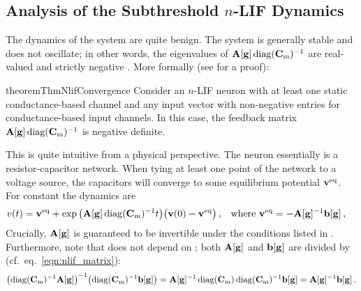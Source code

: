 \pagebreak

\subsection{Analysis of the Subthreshold $n$-LIF Dynamics}
\label{sec:nlif_subth_properties}

The dynamics of the \nlif system are quite benign.
The system is generally stable and does not oscillate; in other words, the eigenvalues of $\mathbf{A}[\mathbf{g}] \operatorname{\mathrm{diag}}({{\mathbf{C}}_\mathrm{m}})^{-1}$ are real-valued and strictly negative \citep[e.g.,][Chapter~5]{strogatz1994nonlinear}.
More formally (see  for a proof):
\begin{restatable}{theorem}{ThmNlifConvergence}
\label{thm:nlif_convergence}
Consider an $n$-LIF neuron with at least one static conductance-based channel and any input vector \vng with non-negative entries for conductance-based input channels.
In this case, the feedback matrix $\mathbf{A}[\mathbf{g}] \operatorname{\mathrm{diag}}({{\mathbf{C}}_\mathrm{m}})^{-1}$ is negative definite.
\end{restatable}
This is quite intuitive from a physical perspective.
The \nlif neuron essentially is a resistor-capacitor network.
When tying at least one point of the network to a voltage source, the capacitors will converge to some equilibrium potential $\mathbf{v}^\mathrm{eq}$.
For constant \vng the dynamics are
\begin{align}
	{{\ensuremath{v}}}(t)
		&= \mathbf{v}^\mathrm{eq} + \exp\big(\mathbf{A}[\mathbf{g}] \operatorname{\mathrm{diag}}({{\mathbf{C}}_\mathrm{m}})^{-1} t\big) \big({\mathbf{v}}(0) - \mathbf{v}^\mathrm{eq}\big) \,,
		& \text{where }  \mathbf{v}^\mathrm{eq} &= -\mathbf{A}[\mathbf{g}]^{-1} \mathbf{b}[\mathbf{g}] \,,
	\label{eqn:nlif_dynamics}
\end{align}
Crucially, $\mathbf{A}[\mathbf{g}]$ is guaranteed to be invertible under the conditions listed in .
Furthermore, note that \vneq does not depend on \vCm; both $\mathbf{A}[\mathbf{g}]$ and $\mathbf{b}[\mathbf{g}]$ are divided by \vCm (cf.~eq.~\ref{eqn:nlif_matrix}):
\begin{align*}
	  \bigl(\operatorname{\mathrm{diag}}({{\mathbf{C}}_\mathrm{m}})^{-1} \mathbf{A}[\mathbf{g}]\bigr)^{-1} \bigl(\operatorname{\mathrm{diag}}({{\mathbf{C}}_\mathrm{m}})^{-1} \mathbf{b}[\mathbf{g}]\bigr)
	= \mathbf{A}[\mathbf{g}]^{-1} \operatorname{\mathrm{diag}}({{\mathbf{C}}_\mathrm{m}}) \operatorname{\mathrm{diag}}({{\mathbf{C}}_\mathrm{m}})^{-1} \mathbf{b}[\mathbf{g}] = \mathbf{A}[\mathbf{g}]^{-1} \mathbf{b}[\mathbf{g}] \,.
\end{align*} 

